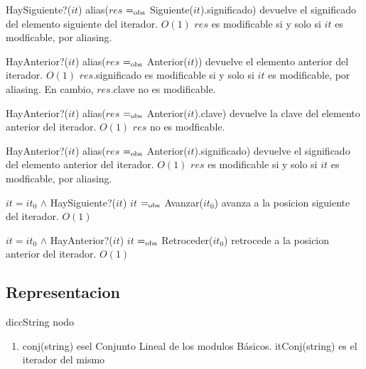   {HaySiguiente?($it$)}
  {alias($res$ $=_{\mathrm{obs}}$ Siguiente($it$).significado)}
  {devuelve el significado del elemento siguiente del iterador.}
  {$O(1)$}
  {$res$ es modificable si y solo si $it$ es modficable, por aliasing.}

  {HayAnterior?($it$)}
  {alias($res$ $=_{\mathrm{obs}}$ Anterior($it$))}
  {devuelve el elemento anterior del iterador.}
  {$O(1)$}
  {$res$.significado es modificable si y solo si $it$ es modificable, por aliasing. En cambio, $res$.clave no es modificable.}

  {HayAnterior?($it$)}
  {alias($res$ $=_{\mathrm{obs}}$ Anterior($it$).clave)}
  {devuelve la clave del elemento anterior del iterador.}
  {$O(1)$}
  {$res$ no es modficable.}

  {HayAnterior?($it$)}
  {alias($res$ $=_{\mathrm{obs}}$ Anterior($it$).significado)}
  {devuelve el significado del elemento anterior del iterador.}
  {$O(1)$}
  {$res$ es modificable si y solo si $it$ es modficable, por aliasing.}


  {$it = it_0$ $\land$ HaySiguiente?($it$)}
  {$it$ $=_{\mathrm{obs}}$ Avanzar($it_0$)}
  {avanza a la posicion siguiente del iterador.}
  {$O(1)$}
  {}

  {$it = it_0$ $\land$ HayAnterior?($it$)}
  {$it$ $=_{\mathrm{obs}}$ Retroceder($it_0$)}
  {retrocede a la posicion anterior del iterador.}
  {$O(1)$}
  {}



\subsection{Representacion}
diccString
nodo

\begin{enumerate}
\item conj(string) esel Conjunto Lineal de los modulos Básicos. itConj(string) es el iterador del mismo

\end{enumerate}

